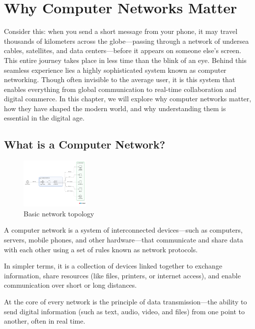 \chapter{Why Computer Networks Matter}

Consider this: when you send a short message from your phone, it may travel thousands of kilometers across the globe—passing through a network of undersea cables, satellites, and data centers—before it appears on someone else’s screen. This entire journey takes place in less time than the blink of an eye. Behind this seamless experience lies a highly sophisticated system known as computer networking. Though often invisible to the average user, it is this system that enables everything from global communication to real-time collaboration and digital commerce. In this chapter, we will explore why computer networks matter, how they have shaped the modern world, and why understanding them is essential in the digital age.

\section{What is a Computer Network?}

\begin{figure}[H]
    \centering
    \includegraphics[width=0.3\textwidth]{images/chapter1/cn.png}
    \caption{Basic network topology}
    \label{fig:network-topology}
\end{figure}

A computer network is a system of interconnected devices—such as computers, servers, mobile phones, and other hardware—that communicate and share data with each other using a set of rules known as network protocols.

In simpler terms, it is a collection of devices linked together to exchange information, share resources (like files, printers, or internet access), and enable communication over short or long distances.

At the core of every network is the principle of data transmission—the ability to send digital information (such as text, audio, video, and files) from one point to another, often in real time.

